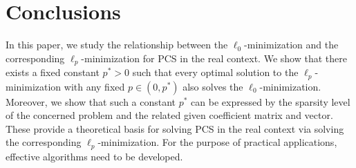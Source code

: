 \documentclass[12pt]{article}
\begin{document}
\section{Conclusions}

In this paper,  we study the relationship between the $\ell_0$-minimization and the corresponding $\ell_p$-minimization for PCS in the real context.
We show that there exists a fixed constant $p^\ast>0$ such that every optimal solution to the $\ell_p$-minimization with any fixed $p\in (0, p^\ast)$ also solves the $\ell_0$-minimization.
Moreover, we show that such a constant $p^\ast$ can be expressed by the sparsity level of the concerned problem and the related given coefficient matrix and vector.  These provide a theoretical basis for solving PCS in the real context via solving the corresponding $\ell_p$-minimization. For the purpose of practical applications, effective algorithms need to be developed.
\end{document}

